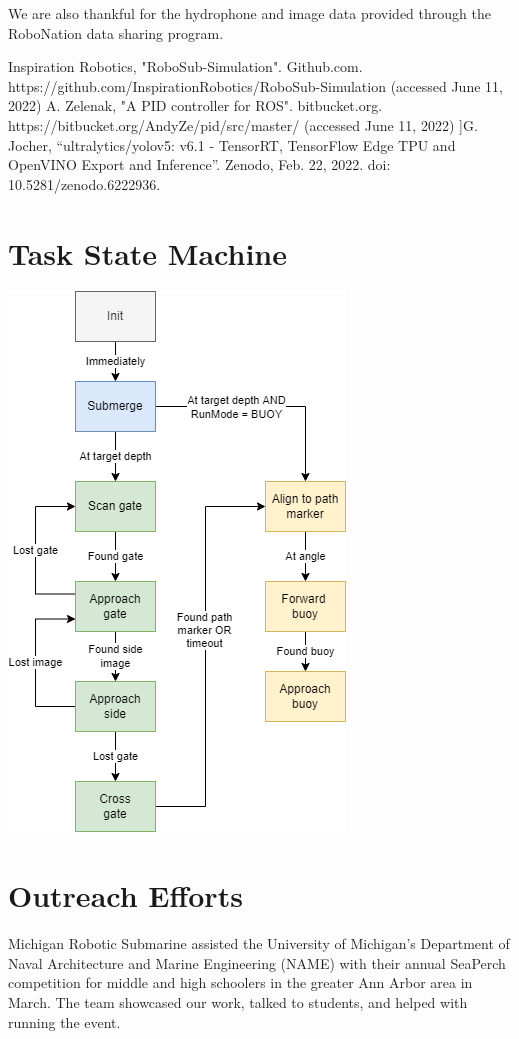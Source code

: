 \documentclass[conference]{IEEEtran}
\begin{document}
We are also thankful for the hydrophone and image data provided through the RoboNation data sharing program.

\begin{thebibliography}{00}
 Inspiration Robotics, "RoboSub-Simulation". Github.com. https://github.com/InspirationRobotics/RoboSub-Simulation (accessed June 11, 2022)
 A. Zelenak, "A PID controller for ROS". bitbucket.org. https://bitbucket.org/AndyZe/pid/src/master/ (accessed June 11, 2022)
 ]G. Jocher, “ultralytics/yolov5: v6.1 - TensorRT, TensorFlow Edge TPU and OpenVINO Export and Inference”. Zenodo, Feb. 22, 2022. doi: 10.5281/zenodo.6222936.

\end{thebibliography}

\clearpage
\appendices
\section{Task State Machine} %

\vspace{0.5cm}
\includegraphics[scale=0.6]{images/task_state_machine.png}
\newpage


\section{Outreach Efforts}
Michigan Robotic Submarine assisted the University of Michigan's Department of Naval Architecture and Marine Engineering (NAME) with their annual SeaPerch competition for middle and high schoolers in the greater Ann Arbor area in March. The team showcased our work, talked to students, and helped with running the event. 
\end{document}
